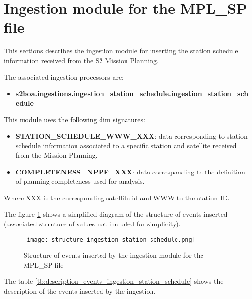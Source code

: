 \section{Ingestion module for the MPL\_SP file}

This sections describes the ingestion module for inserting the station schedule information received from the S2 Mission Planning.

The associated ingestion processors are:

\begin{itemize} 

\item \textbf{s2boa.ingestions.ingestion\_station\_schedule.ingestion\_station\_schedule}
  
\end{itemize}

This module uses the following \acrshort{dim} signatures:

\begin{itemize} 

\item \textbf{STATION\_SCHEDULE\_WWW\_XXX}: data corresponding to station schedule information associated to a specific station and satellite received from the Mission Planning.

\item \textbf{COMPLETENESS\_NPPF\_XXX}: data corresponding to the definition of planning completeness used for analysis.
  
\end{itemize}

Where XXX is the corresponding satellite id and WWW to the station ID.

The figure \ref{fg:structure_ingestion_station_schedule} shows a simplified diagram of the structure of events inserted (associated structure of values not included for simplicity).

\begin{figure}[H]
  \begin{center}
	\centering\texttt{[image: structure\_ingestion\_station\_schedule.png]}
	\caption{Structure of events inserted by the ingestion module for the MPL\_SP file}
	\label{fg:structure_ingestion_station_schedule}
  \end{center}
\end{figure}

The table \ref{tb:description_events_ingestion_station_schedule} shows the description of the events inserted by the ingestion.

